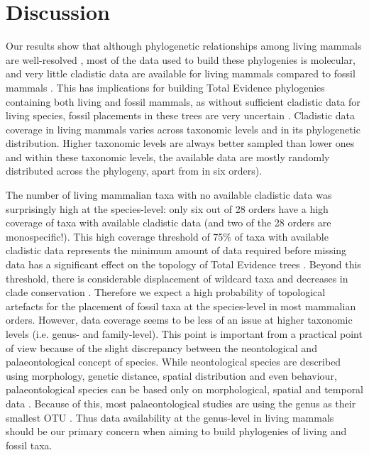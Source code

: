 \section{Discussion}
Our results show that although phylogenetic relationships among living mammals are well-resolved \citep[e.g.][]{bininda-emondsthe2007,meredithimpacts2011} , most of the data used to build these phylogenies is molecular, and very little cladistic data are available for living mammals compared to fossil mammals \citep[e.g.][]{O'Leary08022013,ni2013oldest}.
This has implications for building Total Evidence phylogenies containing both living and fossil mammals, as without sufficient cladistic data for living species, fossil placements in these trees are very uncertain \citep{GuillermeCooper}.
Cladistic data coverage in living mammals varies across taxonomic levels and in its phylogenetic distribution.
Higher taxonomic levels are always better sampled than lower ones and within these taxonomic levels, the available data are mostly randomly distributed across the phylogeny, apart from in six orders).

The number of living mammalian taxa with no available cladistic data was surprisingly high at the species-level: only six out of 28 orders have a high coverage of taxa with available cladistic data (and two of the 28 orders are monospecific!).
This high coverage threshold of 75\% of taxa with available cladistic data represents the minimum amount of data required before missing data has a significant effect on the topology of Total Evidence trees \citep{GuillermeCooper}.
Beyond this threshold, there is considerable displacement of wildcard taxa \citep[\textit{sensu}][]{kearneyfragmentary2002} and decreases in clade conservation \citep{GuillermeCooper}.
Therefore we expect a high probability of topological artefacts for the placement of fossil taxa at the species-level in most mammalian orders.
However, data coverage seems to be less of an issue at higher taxonomic levels (i.e. genus- and family-level).
This point is important from a practical point of view because of the slight discrepancy between the neontological and palaeontological concept of species.
While neontological species are described using morphology, genetic distance, spatial distribution and even behaviour, palaeontological species can be based only on morphological, spatial and temporal data \citep[e.g.][]{ni2013oldest}.
Because of this, most palaeontological studies are using the genus as their smallest OTU \citep[e.g.][]{ni2013oldest,O'Leary08022013}.
Thus data availability at the genus-level in living mammals should be our primary concern when aiming to build phylogenies of living and fossil taxa.

